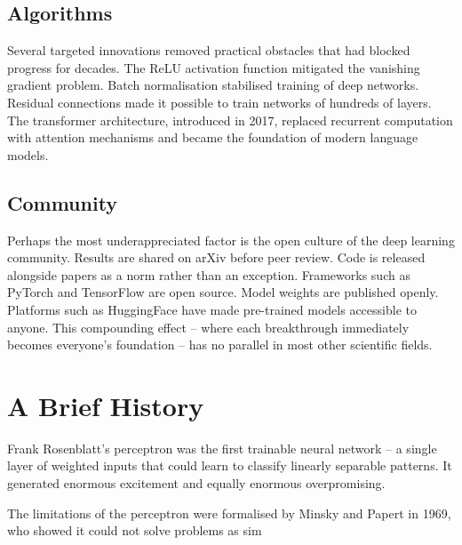 \subsection{Algorithms}

Several targeted innovations removed practical obstacles that had blocked progress for decades. The ReLU activation function mitigated the vanishing gradient problem. Batch normalisation stabilised training of deep networks. Residual connections made it possible to train networks of hundreds of layers. The transformer architecture, introduced in 2017, replaced recurrent computation with attention mechanisms and became the foundation of modern language models.

\subsection{Community}

Perhaps the most underappreciated factor is the open culture of the deep learning community. Results are shared on arXiv before peer review. Code is released alongside papers as a norm rather than an exception. Frameworks such as PyTorch and TensorFlow are open source. Model weights are published openly. Platforms such as HuggingFace have made pre-trained models accessible to anyone. This compounding effect -- where each breakthrough immediately becomes everyone's foundation -- has no parallel in most other scientific fields.

\section{A Brief History}

\begin{example}
Frank Rosenblatt's perceptron was the first trainable neural network -- a single layer of weighted inputs that could learn to classify linearly separable patterns. It generated enormous excitement and equally enormous overpromising.
\end{example}

The limitations of the perceptron were formalised by Minsky and Papert in 1969, who showed it could not solve problems as sim